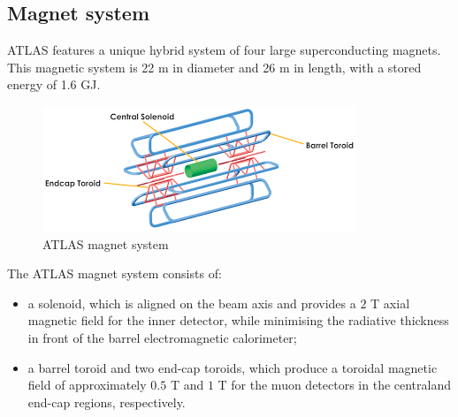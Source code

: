 \documentclass[a4paper, oneside]{book}
\begin{document}
				\subsection{Magnet system}
					\cite{ATLAS config}ATLAS features a unique hybrid system of four large superconducting magnets.  This magnetic system is 22 m in diameter and 26 m in length, with a stored energy of 1.6 GJ. \\
					\begin{figure}[H]
						\centering
						\includegraphics[width=0.5\textheight]{tesi_images/magnet_system_atlas.png}
						\caption{ATLAS magnet system}
					\end{figure}
					The  ATLAS  magnet  system consists of:
					\begin{itemize}
						\item a solenoid, which is aligned on the beam axis and provides a $2$ T axial magnetic field for the inner detector,  while minimising the radiative thickness in front of the barrel electromagnetic calorimeter;
						\item a  barrel  toroid and  two  end-cap  toroids, which  produce  a toroidal magnetic field of approximately $0.5$ T and $1$ T for the muon detectors in the centraland end-cap regions, respectively.
					\end{itemize}
\end{document}
